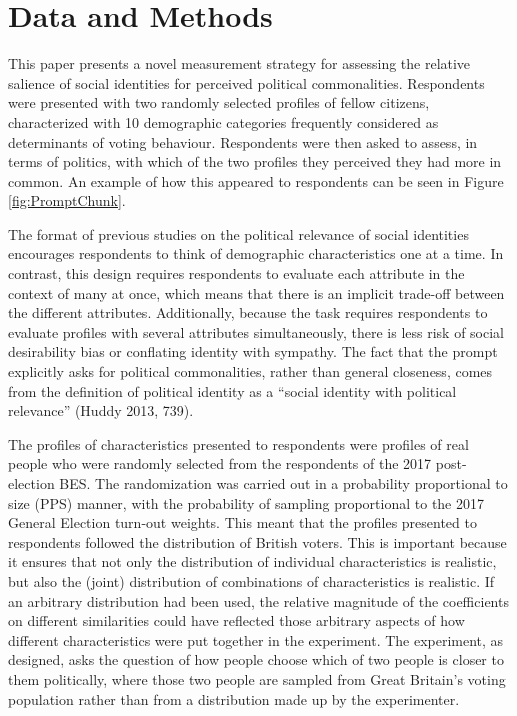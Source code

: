 \documentclass[a4paper]{cupjournal}
\begin{document}
\hypertarget{data-and-methods}{%
\section{Data and Methods}\label{data-and-methods}}

This paper presents a novel measurement strategy for assessing the relative salience of social identities for perceived political commonalities. Respondents were presented with two randomly selected profiles of fellow citizens, characterized with 10 demographic categories frequently considered as determinants of voting behaviour. Respondents were then asked to assess, in terms of politics, with which of the two profiles they perceived they had more in common. An example of how this appeared to respondents can be seen in Figure \ref{fig:PromptChunk}.

The format of previous studies on the political relevance of social identities encourages respondents to think of demographic characteristics one at a time. In contrast, this design requires respondents to evaluate each attribute in the context of many at once, which means that there is an implicit trade-off between the different attributes. Additionally, because the task requires respondents to evaluate profiles with several attributes simultaneously, there is less risk of social desirability bias or conflating identity with sympathy. The fact that the prompt explicitly asks for political commonalities, rather than general closeness, comes from the definition of political identity as a ``social identity with political relevance'' (Huddy 2013, 739).

The profiles of characteristics presented to respondents were profiles of real people who were randomly selected from the respondents of the 2017 post-election BES. The randomization was carried out in a probability proportional to size (PPS) manner, with the probability of sampling proportional to the 2017 General Election turn-out weights. This meant that the profiles presented to respondents followed the distribution of British voters. This is important because it ensures that not only the distribution of individual characteristics is realistic, but also the (joint) distribution of combinations of characteristics is realistic. If an arbitrary distribution had been used, the relative magnitude of the coefficients on different similarities could have reflected those arbitrary aspects of how different characteristics were put together in the experiment. The experiment, as designed, asks the question of how people choose which of two people is closer to them politically, where those two people are sampled from Great Britain's voting population rather than from a distribution made up by the experimenter.
\end{document}
